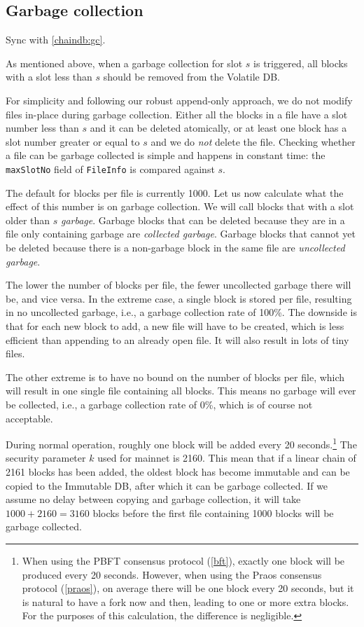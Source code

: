 \subsection{Garbage collection}
\label{volatile:implementation:gc}

 Sync with \cref{chaindb:gc}.

As mentioned above, when a garbage collection for slot $s$ is triggered, all
blocks with a slot less than $s$ should be removed from the Volatile DB.

For simplicity and following our robust append-only approach, we do not modify
files in-place during garbage collection. Either all the blocks in a file have a
slot number less than $s$ and it can be deleted atomically, or at least one
block has a slot number greater or equal to $s$ and we do \emph{not} delete the
file. Checking whether a file can be garbage collected is simple and happens in
constant time: the \lstinline!maxSlotNo! field of \lstinline!FileInfo! is
compared against $s$.

The default for blocks per file is currently \num{1000}. Let us now calculate
what the effect of this number is on garbage collection. We will call blocks
that with a slot older than $s$ \emph{garbage}. Garbage blocks that can be
deleted because they are in a file only containing garbage are \emph{collected
garbage}. Garbage blocks that cannot yet be deleted because there is a
non-garbage block in the same file are \emph{uncollected garbage}.

The lower the number of blocks per file, the fewer uncollected garbage there
will be, and vice versa. In the extreme case, a single block is stored per file,
resulting in no uncollected garbage, i.e., a garbage collection rate of 100\%.
The downside is that for each new block to add, a new file will have to be
created, which is less efficient than appending to an already open file. It will
also result in lots of tiny files.

The other extreme is to have no bound on the number of blocks per file, which
will result in one single file containing all blocks. This means no garbage will
ever be collected, i.e., a garbage collection rate of 0\%, which is of course
not acceptable.

During normal operation, roughly one block will be added every 20
seconds.\footnote{When using the PBFT consensus protocol (\cref{bft}), exactly
one block will be produced every 20 seconds. However, when using the Praos
consensus protocol (\cref{praos}), on average there will be one block every 20
seconds, but it is natural to have a fork now and then, leading to one or more
extra blocks. For the purposes of this calculation, the difference is
negligible.} The security parameter $k$ used for mainnet is \num{2160}. This
mean that if a linear chain of \num{2161} blocks has been added, the oldest
block has become immutable and can be copied to the Immutable DB, after which it
can be garbage collected. If we assume no delay between copying and garbage
collection, it will take $\num{1000} + \num{2160} = \num{3160}$ blocks before
the first file containing \num{1000} blocks will be garbage collected.

